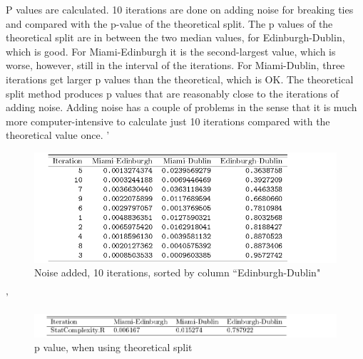P values are calculated. 10 iterations are done on adding noise for breaking ties and compared with the p-value of the theoretical split. The p values of the theoretical split are in between the two median values, for Edinburgh-Dublin, which is good. For Miami-Edinburgh it is the second-largest value, which is worse, however, still in the interval of the iterations. For Miami-Dublin, three iterations get larger p values than the theoretical, which is OK. The theoretical split method produces p values that are reasonably close to the iterations of adding noise. Adding noise has a couple of problems in the sense that it is much more computer-intensive to calculate just 10 iterations compared with the theoretical value once.
'\begin{figure}
    \centering
    \includegraphics[width=\textwidth,keepaspectratio]{Weather/pValuesTheoretical,10=Iterations,Sorted.pdf}
    \caption{Noise added, 10 iterations, sorted by column “Edinburgh-Dublin"}
\end{figure}

'\begin{figure}
    \centering
    \includegraphics[width=\textwidth,keepaspectratio]{Weather/pValuesTheoretical.pdf}
    \caption{p value, when using theoretical split}
\end{figure}

